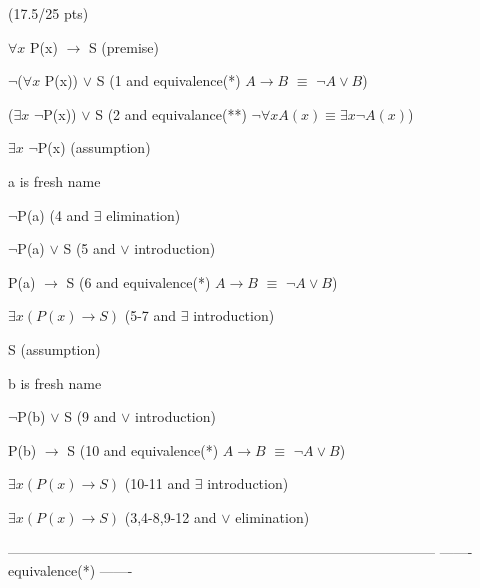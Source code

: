 \documentclass[a4paper,12pt]{article}
\newcommand\tab[1][1cm]{\hspace*{#1}}
\begin{document}
\hfill \small{(17.5/25 pts)}\\
\begin{tcolorbox}
\begin{enumerate}
    \item $\forall x$ P(x) $\rightarrow$ S  \tab (premise)
    \item $\neg$($\forall x$ P(x)) $\vee$ S  \tab (1 and equivalence(*) $A \rightarrow B$ $\equiv$ $\neg A \vee B$)
    \item ($\exists x$ $\neg$P(x)) $\vee$ S  \tab (2 and equivalance(**) $ \neg \forall x A(x) \equiv \exists x \neg A(x)$)
    \begin{tcolorbox}
        \item $\exists x$ $\neg$P(x) \tab (assumption)
        \begin{tcolorbox}
            a is fresh name
            \item $\neg$P(a) \tab (4 and $\exists$ elimination)
            \item $\neg$P(a) $\vee$ S \tab (5 and $\vee$ introduction)
            \item P(a) $\rightarrow$ S \tab (6 and equivalence(*) $A \rightarrow B$ $\equiv$ $\neg A \vee B$)
        \end{tcolorbox}
        \item $\exists x (P(x)\rightarrow S)$ \tab   (5-7 and $\exists$ introduction)
    \end{tcolorbox}
    \begin{tcolorbox}
        \item S \tab (assumption)
        \begin{tcolorbox}
            b is fresh name
            \item $\neg$P(b) $\vee$ S \tab (9 and $\vee$ introduction)
            \item P(b) $\rightarrow$ S \tab (10 and equivalence(*) $A \rightarrow B$ $\equiv$ $\neg A \vee B$)
        \end{tcolorbox}
        \item $\exists x (P(x)\rightarrow S)$ \tab   (10-11 and $\exists$ introduction)
    \end{tcolorbox}
    \item $\exists x (P(x)\rightarrow S)$ \tab   (3,4-8,9-12 and $\vee$ elimination)
\end{enumerate}
\begin{center}
--------------------------------------------------------------------------------------------\newline
------- equivalence(*) -------

\end{center}
\end{tcolorbox}
\end{document}
